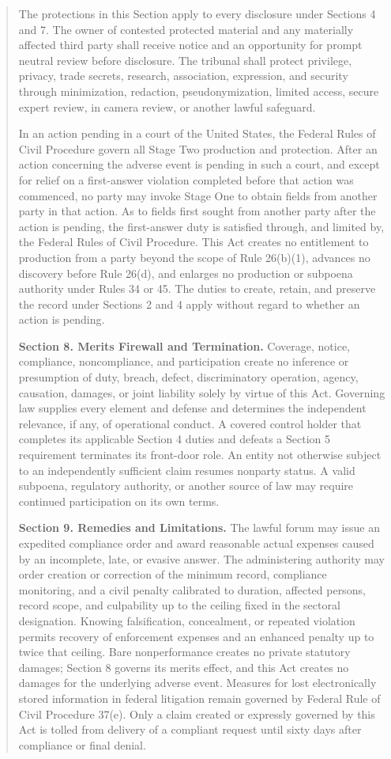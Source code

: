 \begin{quote}
The protections in this Section apply to every disclosure under Sections 4 and 7. The owner of contested protected material and any materially affected third party shall receive notice and an opportunity for prompt neutral review before disclosure. The tribunal shall protect privilege, privacy, trade secrets, research, association, expression, and security through minimization, redaction, pseudonymization, limited access, secure expert review, in camera review, or another lawful safeguard.

In an action pending in a court of the United States, the Federal Rules of Civil Procedure govern all Stage Two production and protection. After an action concerning the adverse event is pending in such a court, and except for relief on a first-answer violation completed before that action was commenced, no party may invoke Stage One to obtain fields from another party in that action. As to fields first sought from another party after the action is pending, the first-answer duty is satisfied through, and limited by, the Federal Rules of Civil Procedure. This Act creates no entitlement to production from a party beyond the scope of Rule 26(b)(1), advances no discovery before Rule 26(d), and enlarges no production or subpoena authority under Rules 34 or 45. The duties to create, retain, and preserve the record under Sections 2 and 4 apply without regard to whether an action is pending.

\textbf{Section 8. Merits Firewall and Termination.} Coverage, notice, compliance, noncompliance, and participation create no inference or presumption of duty, breach, defect, discriminatory operation, agency, causation, damages, or joint liability solely by virtue of this Act. Governing law supplies every element and defense and determines the independent relevance, if any, of operational conduct. A covered control holder that completes its applicable Section 4 duties and defeats a Section 5 requirement terminates its front-door role. An entity not otherwise subject to an independently sufficient claim resumes nonparty status. A valid subpoena, regulatory authority, or another source of law may require continued participation on its own terms.

\textbf{Section 9. Remedies and Limitations.} The lawful forum may issue an expedited compliance order and award reasonable actual expenses caused by an incomplete, late, or evasive answer. The administering authority may order creation or correction of the minimum record, compliance monitoring, and a civil penalty calibrated to duration, affected persons, record scope, and culpability up to the ceiling fixed in the sectoral designation. Knowing falsification, concealment, or repeated violation permits recovery of enforcement expenses and an enhanced penalty up to twice that ceiling. Bare nonperformance creates no private statutory damages; Section 8 governs its merits effect, and this Act creates no damages for the underlying adverse event. Measures for lost electronically stored information in federal litigation remain governed by Federal Rule of Civil Procedure 37(e). Only a claim created or expressly governed by this Act is tolled from delivery of a compliant request until sixty days after compliance or final denial.


\end{quote}
